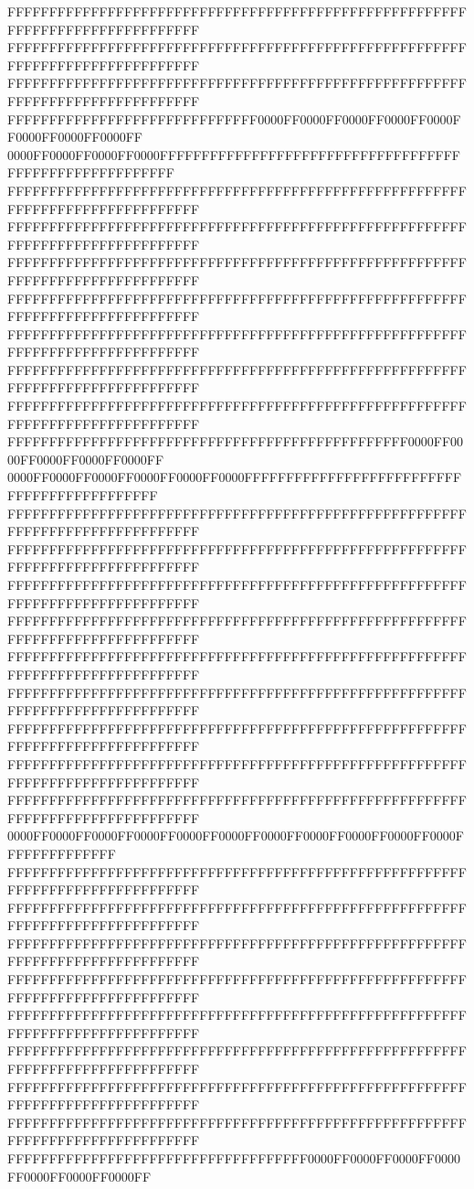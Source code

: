 FFFFFFFFFFFFFFFFFFFFFFFFFFFFFFFFFFFFFFFFFFFFFFFFFFFFFFFFFFFFFFFFFFFFFFFFFFFFFF
FFFFFFFFFFFFFFFFFFFFFFFFFFFFFFFFFFFFFFFFFFFFFFFFFFFFFFFFFFFFFFFFFFFFFFFFFFFFFF
FFFFFFFFFFFFFFFFFFFFFFFFFFFFFFFFFFFFFFFFFFFFFFFFFFFFFFFFFFFFFFFFFFFFFFFFFFFFFF
FFFFFFFFFFFFFFFFFFFFFFFFFFFFFF0000FF0000FF0000FF0000FF0000FF0000FF0000FF0000FF
0000FF0000FF0000FF0000FFFFFFFFFFFFFFFFFFFFFFFFFFFFFFFFFFFFFFFFFFFFFFFFFFFFFFFF
FFFFFFFFFFFFFFFFFFFFFFFFFFFFFFFFFFFFFFFFFFFFFFFFFFFFFFFFFFFFFFFFFFFFFFFFFFFFFF
FFFFFFFFFFFFFFFFFFFFFFFFFFFFFFFFFFFFFFFFFFFFFFFFFFFFFFFFFFFFFFFFFFFFFFFFFFFFFF
FFFFFFFFFFFFFFFFFFFFFFFFFFFFFFFFFFFFFFFFFFFFFFFFFFFFFFFFFFFFFFFFFFFFFFFFFFFFFF
FFFFFFFFFFFFFFFFFFFFFFFFFFFFFFFFFFFFFFFFFFFFFFFFFFFFFFFFFFFFFFFFFFFFFFFFFFFFFF
FFFFFFFFFFFFFFFFFFFFFFFFFFFFFFFFFFFFFFFFFFFFFFFFFFFFFFFFFFFFFFFFFFFFFFFFFFFFFF
FFFFFFFFFFFFFFFFFFFFFFFFFFFFFFFFFFFFFFFFFFFFFFFFFFFFFFFFFFFFFFFFFFFFFFFFFFFFFF
FFFFFFFFFFFFFFFFFFFFFFFFFFFFFFFFFFFFFFFFFFFFFFFFFFFFFFFFFFFFFFFFFFFFFFFFFFFFFF
FFFFFFFFFFFFFFFFFFFFFFFFFFFFFFFFFFFFFFFFFFFFFFFF0000FF0000FF0000FF0000FF0000FF
0000FF0000FF0000FF0000FF0000FF0000FFFFFFFFFFFFFFFFFFFFFFFFFFFFFFFFFFFFFFFFFFFF
FFFFFFFFFFFFFFFFFFFFFFFFFFFFFFFFFFFFFFFFFFFFFFFFFFFFFFFFFFFFFFFFFFFFFFFFFFFFFF
FFFFFFFFFFFFFFFFFFFFFFFFFFFFFFFFFFFFFFFFFFFFFFFFFFFFFFFFFFFFFFFFFFFFFFFFFFFFFF
FFFFFFFFFFFFFFFFFFFFFFFFFFFFFFFFFFFFFFFFFFFFFFFFFFFFFFFFFFFFFFFFFFFFFFFFFFFFFF
FFFFFFFFFFFFFFFFFFFFFFFFFFFFFFFFFFFFFFFFFFFFFFFFFFFFFFFFFFFFFFFFFFFFFFFFFFFFFF
FFFFFFFFFFFFFFFFFFFFFFFFFFFFFFFFFFFFFFFFFFFFFFFFFFFFFFFFFFFFFFFFFFFFFFFFFFFFFF
FFFFFFFFFFFFFFFFFFFFFFFFFFFFFFFFFFFFFFFFFFFFFFFFFFFFFFFFFFFFFFFFFFFFFFFFFFFFFF
FFFFFFFFFFFFFFFFFFFFFFFFFFFFFFFFFFFFFFFFFFFFFFFFFFFFFFFFFFFFFFFFFFFFFFFFFFFFFF
FFFFFFFFFFFFFFFFFFFFFFFFFFFFFFFFFFFFFFFFFFFFFFFFFFFFFFFFFFFFFFFFFFFFFFFFFFFFFF
FFFFFFFFFFFFFFFFFFFFFFFFFFFFFFFFFFFFFFFFFFFFFFFFFFFFFFFFFFFFFFFFFFFFFFFFFFFFFF
0000FF0000FF0000FF0000FF0000FF0000FF0000FF0000FF0000FF0000FF0000FFFFFFFFFFFFFF
FFFFFFFFFFFFFFFFFFFFFFFFFFFFFFFFFFFFFFFFFFFFFFFFFFFFFFFFFFFFFFFFFFFFFFFFFFFFFF
FFFFFFFFFFFFFFFFFFFFFFFFFFFFFFFFFFFFFFFFFFFFFFFFFFFFFFFFFFFFFFFFFFFFFFFFFFFFFF
FFFFFFFFFFFFFFFFFFFFFFFFFFFFFFFFFFFFFFFFFFFFFFFFFFFFFFFFFFFFFFFFFFFFFFFFFFFFFF
FFFFFFFFFFFFFFFFFFFFFFFFFFFFFFFFFFFFFFFFFFFFFFFFFFFFFFFFFFFFFFFFFFFFFFFFFFFFFF
FFFFFFFFFFFFFFFFFFFFFFFFFFFFFFFFFFFFFFFFFFFFFFFFFFFFFFFFFFFFFFFFFFFFFFFFFFFFFF
FFFFFFFFFFFFFFFFFFFFFFFFFFFFFFFFFFFFFFFFFFFFFFFFFFFFFFFFFFFFFFFFFFFFFFFFFFFFFF
FFFFFFFFFFFFFFFFFFFFFFFFFFFFFFFFFFFFFFFFFFFFFFFFFFFFFFFFFFFFFFFFFFFFFFFFFFFFFF
FFFFFFFFFFFFFFFFFFFFFFFFFFFFFFFFFFFFFFFFFFFFFFFFFFFFFFFFFFFFFFFFFFFFFFFFFFFFFF
FFFFFFFFFFFFFFFFFFFFFFFFFFFFFFFFFFFF0000FF0000FF0000FF0000FF0000FF0000FF0000FF
